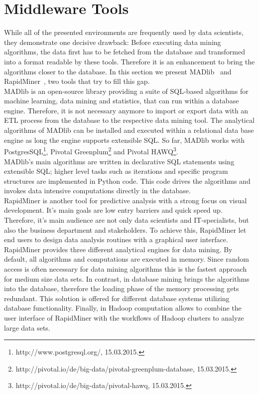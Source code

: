 \section{Middleware Tools}
While all of the presented environments are frequently used by data scientists, they demonstrate one decisive drawback: Before executing data mining algorithms, the data first has to be fetched from the database and transformed into a format readable by these tools. Therefore it is an enhancement to bring the algorithms closer to the database. In this section we present MADlib~\parencite{MADlib} and RapidMiner~\parencite{rapidminer}, two tools that try to fill this gap.
\\
MADlib is an open-source library providing a suite of SQL-based algorithms for machine learning, data mining and statistics, that can run within a database engine. Therefore, it is not necessary anymore to import or export data with an ETL process from the database to the respective data mining tool. The analytical algorithms of MADlib can be installed and executed within a relational data base engine as long the engine supports extensible SQL. So far, MADlib works with PostgresSQL\footnote{http://www.postgresql.org/, 15.03.2015.}, Pivotal Greenplum\footnote{http://pivotal.io/de/big-data/pivotal-greenplum-database, 15.03.2015.} and Pivotal HAWQ\footnote{http://pivotal.io/de/big-data/pivotal-hawq, 15.03.2015.}.
\\
MADlib's main algorithms are written in declarative SQL statements using extensible SQL; higher level tasks such as iterations and specific program structures are implemented in Python code. This code drives the algorithms and invokes data intensive computations directly in the database.
\\
RapidMiner is another tool for predictive analysis with a strong focus on visual development. It's main goals are low entry barriers and quick speed up. Therefore, it's main audience are not only data scientists and IT-specialists, but also the business department and stakeholders. To achieve this, RapidMiner let end users to design data analysis routines with a graphical user interface.
\\
RapidMiner provides three different analytical engines for data mining. By default, all algorithms and computations are executed in memory. Since random access is often necessary for data mining algorithms this is the fastest approach for medium size data sets. In contrast, in database mining brings the algorithms into the database, therefore the loading phase of the memory processing gets redundant. This solution is offered for different database systems utilizing database functionality. Finally, in Hadoop computation allows to combine the user interface of RapidMiner with the workflows of Hadoop clusters to analyze large data sets.
